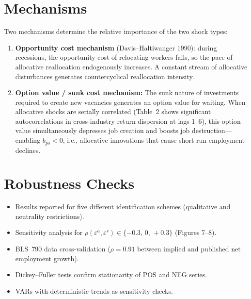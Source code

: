 \section{Mechanisms}

Two mechanisms determine the relative importance of the two shock types:

\begin{enumerate}
  \item \textbf{Opportunity cost mechanism} (Davis--Haltiwanger 1990): during
    recessions, the opportunity cost of relocating workers falls, so the pace
    of allocative reallocation endogenously increases. A constant stream of
    allocative disturbances generates countercyclical reallocation intensity.

  \item \textbf{Option value / sunk cost mechanism:} The sunk nature of
    investments required to create new vacancies generates an option value
    for waiting. When allocative shocks are serially correlated (Table~2
    shows significant autocorrelations in cross-industry return dispersion
    at lags 1--6), this option value simultaneously depresses job creation
    and boosts job destruction---enabling $b_{ps}<0$, i.e., allocative
    innovations that cause short-run employment declines.
\end{enumerate}

\section{Robustness Checks}

\begin{itemize}
  \item Results reported for five different identification schemes (qualitative
    and neutrality restrictions).
  \item Sensitivity analysis for $\rho(\varepsilon^a,\varepsilon^s)
    \in\{-0.3,\,0,\,+0.3\}$ (Figures 7--8).
  \item BLS~790 data cross-validation ($\rho = 0.91$ between implied and
    published net employment growth).
  \item Dickey--Fuller tests confirm stationarity of POS and NEG series.
  \item VARs with deterministic trends as sensitivity checks.
\end{itemize}

